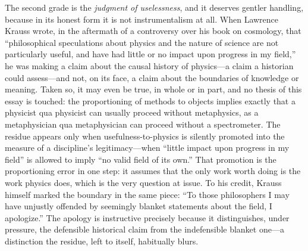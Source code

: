 The second grade is the \emph{judgment of uselessness}, and it deserves gentler handling, because in its honest form it is not instrumentalism at all. When Lawrence Krauss wrote, in the aftermath of a controversy over his book on cosmology, that ``philosophical speculations about physics and the nature of science are not particularly useful, and have had little or no impact upon progress in my field,'' he was making a claim about the causal history of physics---a claim a historian could assess---and not, on its face, a claim about the boundaries of knowledge or meaning. Taken so, it may even be true, in whole or in part, and no thesis of this essay is touched: the proportioning of methods to objects implies exactly that a physicist qua physicist can usually proceed without metaphysics, as a metaphysician qua metaphysician can proceed without a spectrometer. The residue appears only when usefulness-to-physics is silently promoted into the measure of a discipline's legitimacy---when ``little impact upon progress in my field'' is allowed to imply ``no valid field of its own.'' That promotion is the proportioning error in one step: it assumes that the only work worth doing is the work physics does, which is the very question at issue. To his credit, Krauss himself marked the boundary in the same piece: ``To those philosophers I may have unjustly offended by seemingly blanket statements about the field, I apologize.'' The apology is instructive precisely because it distinguishes, under pressure, the defensible historical claim from the indefensible blanket one---a distinction the residue, left to itself, habitually blurs.

